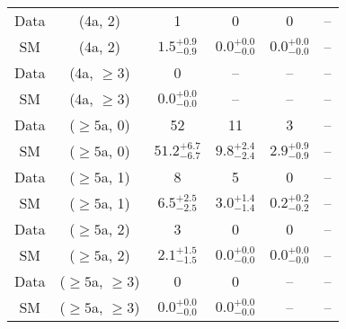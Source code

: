 \begin{table}[h!]
{\begin{tabular}{cccccc}
	Data & (4a, 2) & 1 & 0 & 0 & -- \\[0.5ex] 
	SM & (4a, 2) & $1.5^{+ 0.9 }_{- 0.9 }$ & $0.0^{+ 0.0 }_{- 0.0 }$ & $0.0^{+ 0.0 }_{- 0.0 }$ & -- \\[0.5ex] 
	Data & (4a, $\ge3$) & 0 & -- & -- & -- \\[0.5ex] 
	SM & (4a, $\ge3$) & $0.0^{+ 0.0 }_{- 0.0 }$ & -- & -- & -- \\[0.5ex] 
	Data & ($\ge5$a, 0) & 52 & 11 & 3 & -- \\[0.5ex] 
	SM & ($\ge5$a, 0) & $51.2^{+ 6.7 }_{- 6.7 }$ & $9.8^{+ 2.4 }_{- 2.4 }$ & $2.9^{+ 0.9 }_{- 0.9 }$ & -- \\[0.5ex] 
	Data & ($\ge5$a, 1) & 8 & 5 & 0 & -- \\[0.5ex] 
	SM & ($\ge5$a, 1) & $6.5^{+ 2.5 }_{- 2.5 }$ & $3.0^{+ 1.4 }_{- 1.4 }$ & $0.2^{+ 0.2 }_{- 0.2 }$ & -- \\[0.5ex] 
	Data & ($\ge5$a, 2) & 3 & 0 & 0 & -- \\[0.5ex] 
	SM & ($\ge5$a, 2) & $2.1^{+ 1.5 }_{- 1.5 }$ & $0.0^{+ 0.0 }_{- 0.0 }$ & $0.0^{+ 0.0 }_{- 0.0 }$ & -- \\[0.5ex] 
	Data & ($\ge5$a, $\ge3$) & 0 & 0 & -- & -- \\[0.5ex] 
	SM & ($\ge5$a, $\ge3$) & $0.0^{+ 0.0 }_{- 0.0 }$ & $0.0^{+ 0.0 }_{- 0.0 }$ & -- & -- \\[0.5ex] 
	\hline
	\hline
\end{tabular}}
\end{table}
